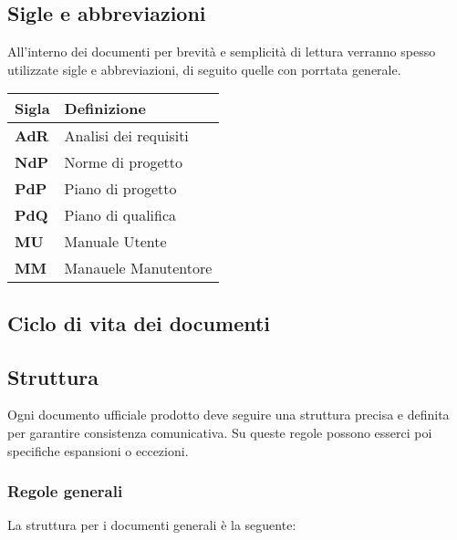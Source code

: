 \subsection{Sigle e abbreviazioni}

All'interno dei documenti per brevità e semplicità di lettura verranno spesso utilizzate sigle e abbreviazioni, di seguito quelle con porrtata generale.

\begin{center}
    \begin{tabularx}{\linewidth}{l | X }            
        \textbf{Sigla} & \textbf{Definizione}\\
        \hline
        \textbf{AdR} & Analisi dei requisiti\\
        \textbf{NdP}& Norme di progetto\\
        \textbf{PdP}& Piano di progetto\\
        \textbf{PdQ}& Piano di qualifica\\
        \textbf{MU}& Manuale Utente\\
        \textbf{MM}& Manauele Manutentore\\
    \end{tabularx}
\end{center}

\subsection{Ciclo di vita dei documenti}

\subsection{Struttura}

Ogni documento ufficiale prodotto deve seguire una struttura precisa e definita per garantire consistenza comunicativa. Su queste regole possono esserci poi specifiche espansioni o eccezioni.

\subsubsection{Regole generali}

La struttura per i documenti generali è la seguente:

